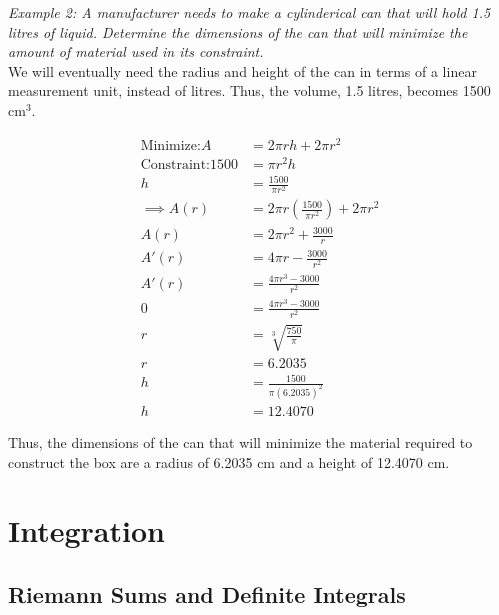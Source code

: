 \documentclass{article}
\begin{document}
        \noindent \color{blue} \textit{Example 2: A manufacturer needs to make a cylinderical can
        that will hold 1.5 litres of liquid. Determine the dimensions of the can that will
        minimize the amount of material used in its constraint.} \color{black} \\

        \noindent We will eventually need the radius and height of the can in terms of a linear
        measurement unit, instead of litres. Thus, the volume, 1.5 litres, becomes 1500 $\text{cm}^3$.

        \begin{align*}
            \text{Minimize:} A      &= 2\pi rh+2\pi r^2 \\
            \text{Constraint:} 1500 &= \pi r^2 h \\
            h                       &= \frac{1500}{\pi r^2} \\
            \implies A(r)           &= 2\pi r\left(\frac{1500}{\pi r^2}\right) + 2\pi r^2 \\
            A(r)                    &= 2\pi r^2 + \frac{3000}{r} \\
            A'(r)                   &= 4\pi r - \frac{3000}{r^2} \\
            A'(r)                   &= \frac{4\pi r^3 - 3000}{r^2} \\
            0                       &= \frac{4\pi r^3 - 3000}{r^2} \\
            r                       &= \sqrt[3]{\frac{750}{\pi}} \\
            r                       &= 6.2035 \\
            h                       &= \frac{1500}{\pi(6.2035)^2} \\
            h                       &= 12.4070
        \end{align*}

        \noindent Thus, the dimensions of the can that will minimize the material required to
        construct the box are a radius of 6.2035 cm and a height of 12.4070 cm.

    \pagebreak

    \section{Integration}

        \subsection{Riemann Sums and Definite Integrals}
\end{document}
